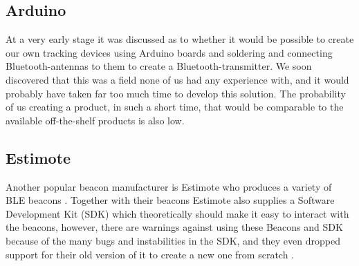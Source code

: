\documentclass[../Main/thesis.tex]{subfiles}
\begin{document}
\subsection{Arduino}
At a very early stage it was discussed as to whether it would be possible to create our own tracking devices using Arduino boards and soldering and connecting Bluetooth-antennas to them to create a Bluetooth-transmitter.
We soon discovered that this was a field none of us had any experience with, and it would probably have taken far too much time to develop this solution.
The probability of us creating a product, in such a short time, that would be comparable to the available off-the-shelf products is also low.

\subsection{Estimote}
Another popular beacon manufacturer is Estimote who produces a variety of BLE beacons \citep{EstimoteInc.2018}.
Together with their beacons Estimote also supplies a Software Development Kit (SDK) which theoretically should make it easy to interact with the beacons, however, there are warnings against using these Beacons and SDK because of the many bugs and instabilities in the SDK, and they even dropped support for their old version of it to create a new one from scratch \citep{Saetre2017}.


\onlyinsubfile{}
\onlyinsubfile{}
\end{document}

